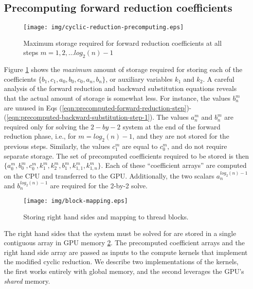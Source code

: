 \subsection{Precomputing forward reduction coefficients}

\begin{figure}
\begin{center}
\texttt{[image: img/cyclic-reduction-precomputing.eps]}
\end{center}
\caption{Maximum storage required for forward reduction coefficients
at all steps $m=1, 2, ... log_2(n)-1$}
\label{fig:cyclic-reduction-precomputing}
\end{figure}

Figure \ref{fig:cyclic-reduction-precomputing}
shows the
\emph{maximum} amount of storage required for
storing each of the coefficients
$\{b_1, c_1, a_0, b_0, c_0, a_n, b_n\}$,
or auxiliary variables $k_1$ and $k_2$.
A careful analysis of the
forward reduction and backward substitution equations
reveals that the actual amount of storage is somewhat less.
For instance,
the values $b_n^m$ are unused
in Eqs (\ref{eqn:precomputed-forward-reduction-step})-
(\ref{eqn:precomputed-backward-substitution-step-1}).
The values $a_n^m$ and $b_n^m$ are
required only for solving the $2-by-2$
system at the end of the forward reduction phase,
i.e., for $m=log_2(n)-1$,
and they are not stored for the previous steps.
Similarly, the values $c_1^m$ are equal to $c_0^m$,
and do not require separate storage.
The set of precomputed coefficients required to be stored is then
$\{a_0^m, b_0^m, c_0^m, k_1^m, k_2^m, b_1^m, k_{1,1}^m, k_{1,n}^m\}$.
Each of these ``coefficient arrays'' are computed on the CPU
and transferred to the GPU.
Additionally, the two scalars $a_n^{log_2(n)-1}$ and $b_n^{log_2(n)-1}$
are required for the 2-by-2 solve.
%
\begin{figure}
\begin{center}
\texttt{[image: img/block-mapping.eps]}
\end{center}
\caption{Storing right hand sides and mapping to thread blocks.}
\label{fig:block-mapping}
\end{figure}
%
The right hand sides that the system must be solved for
are stored in a single contiguous array in GPU memory
\ref{fig:block-mapping}.
The precomputed coefficient arrays and the right hand side array
are passed as inputs to the compute kernels that implement
the modified cyclic reduction.
We describe two implementations of the kernels,
the first works entirely with global memory,
and the second leverages the GPU's \emph{shared} memory.

